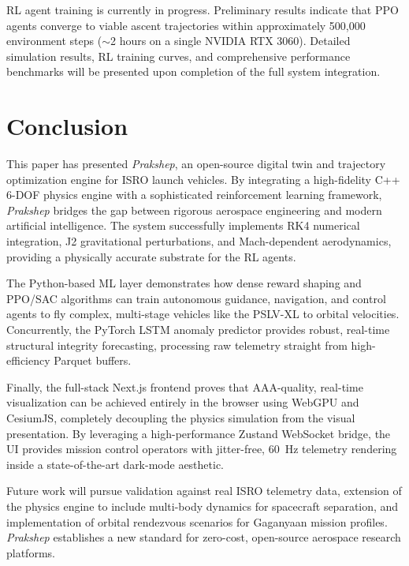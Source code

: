 \documentclass[conference]{IEEEtran}
\begin{document}
RL agent training is currently in progress. Preliminary results indicate that PPO agents converge to viable ascent trajectories within approximately 500,000 environment steps ($\sim$2 hours on a single NVIDIA RTX 3060). Detailed simulation results, RL training curves, and comprehensive performance benchmarks will be presented upon completion of the full system integration.

\section{Conclusion}

This paper has presented \textit{Prakshep}, an open-source digital twin and trajectory optimization engine for ISRO launch vehicles. By integrating a high-fidelity C++ 6-DOF physics engine with a sophisticated reinforcement learning framework, \textit{Prakshep} bridges the gap between rigorous aerospace engineering and modern artificial intelligence. The system successfully implements RK4 numerical integration, J2 gravitational perturbations, and Mach-dependent aerodynamics, providing a physically accurate substrate for the RL agents.

The Python-based ML layer demonstrates how dense reward shaping and PPO/SAC algorithms can train autonomous guidance, navigation, and control agents to fly complex, multi-stage vehicles like the PSLV-XL to orbital velocities. Concurrently, the PyTorch LSTM anomaly predictor provides robust, real-time structural integrity forecasting, processing raw telemetry straight from high-efficiency Parquet buffers.

Finally, the full-stack Next.js frontend proves that AAA-quality, real-time visualization can be achieved entirely in the browser using WebGPU and CesiumJS, completely decoupling the physics simulation from the visual presentation. By leveraging a high-performance Zustand WebSocket bridge, the UI provides mission control operators with jitter-free, 60~Hz telemetry rendering inside a state-of-the-art dark-mode aesthetic. 

Future work will pursue validation against real ISRO telemetry data, extension of the physics engine to include multi-body dynamics for spacecraft separation, and implementation of orbital rendezvous scenarios for Gaganyaan mission profiles. \textit{Prakshep} establishes a new standard for zero-cost, open-source aerospace research platforms.
\end{document}
